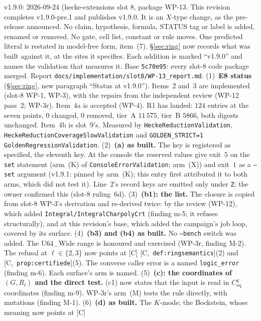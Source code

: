 \documentclass[11pt]{article}
\theoremstyle{remark}
\newcommand{\HA}[1]{[C,~\texttt{#1}]}      %
\begin{document}
v1.9.0: 2026-09-24 (hecke-extensions slot 8, package WP-13. This revision
completes v1.9.0-pre.1 and publishes v1.9.0. It is an $X$-type change, as the pre-release
announced. No claim, hypothesis, formula, STATUS tag or label is added, renamed or removed. No
gate, cell list, constant or rule moves. One predicted literal is restated in model-free form,
item~(7). \S\ref{sec:ring} now records what was built against it,
at the sites it specifies. Each addition is marked ``v1.9.0'' and names the validation that
measures it. Base \texttt{5c70e95}: every slot-8 code package merged. Report
\texttt{docs/implementation/slot8/WP-13\_report.md}.
(1)~\textbf{E8 status} (\S\ref{sec:ring}, new paragraph ``Status at v1.9.0''). Items~2 and~3 are
implemented (slot-8 WP-1, WP-3), with the repairs from the independent review (WP-12 pass~2;
WP-3r). Item~4a is accepted (WP-4). R1 has landed: $124$ entries at the seven points, $0$
changed, $0$ removed, tier~A $11\,575$, tier~B $5866$, both digests unchanged. Item~4b is slot~9's.
Measured by \texttt{HeckeReductionValidation}, \texttt{HeckeReductionCoverageSlowValidation} and
\texttt{GOLDEN\_STRICT=1 GoldenRegressionValidation}.
(2)~\textbf{(a) as built.} The key is registered as specified, the eleventh key. At the console
the reserved values give exit~$5$ on the \texttt{set} statement (arm~(K) of
\texttt{ConsoleErrorValidation}; arm~(X)) and exit~$1$ as a \texttt{--set} argument (v1.9.1:
pinned by arm~(K); this entry first attributed it to both arms, which did not test it). Line~2's record keys are emitted
only under \texttt{Z}; the owner confirmed this (slot-8 ruling~6d).
(3)~\textbf{(b1): the list.} The closure is copied from slot-8 WP-3's derivation and re-derived
twice: by the review (WP-12), which added
\texttt{Integral/IntegralCharpolyCrt} (finding m-5; it refuses structurally), and at this
revision's base, which added the campaign's job loop, covered by its surface.
(4)~\textbf{(b3) and (b4) as built.} No \texttt{--bench} switch was added. The U64\_Wide range is
honoured and exercised (WP-3r, finding M-2). The refusal at $\ell\in\{2,3\}$ now points at [C]
\HA{def:ringsemantics}(2) and \HA{prop:certifiede}(5). The converse caller error is a named
\texttt{logic\_error} (finding m-6). Each surface's arm is named.
(5)~\textbf{(c): the coordinates of $(G,R_l)$ and the direct test.} (c1) now states that the input
is read in $C^q_{\mathrm{eq}}$ coordinates (finding m-9). WP-3r's arm~(M) tests the rule directly,
with mutations (finding M-1).
(6)~\textbf{(d) as built.} The $K$-mode; the Bockstein, whose meaning now points at [C]
\end{document}
